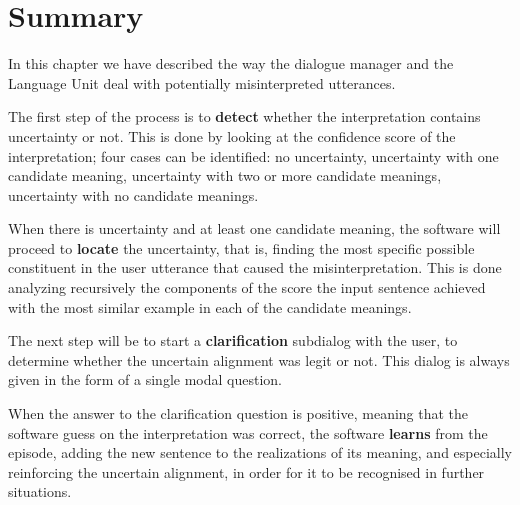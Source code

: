 \section{Summary}
In this chapter we have described the way the dialogue manager and the Language Unit deal with potentially misinterpreted utterances.

The first step of the process is to \textbf{detect} whether the interpretation contains uncertainty or not. This is done by looking at the confidence score of the interpretation; four cases can be identified: no uncertainty, uncertainty with one candidate meaning, uncertainty with two or more candidate meanings, uncertainty with no candidate meanings.

When there is uncertainty and at least one candidate meaning, the software will proceed to \textbf{locate} the uncertainty, that is, finding the most specific possible constituent in the user utterance that caused the misinterpretation. This is done analyzing recursively the components of the score the input sentence achieved with the most similar example in each of the candidate meanings.

The next step will be to start a \textbf{clarification} subdialog with the user, to determine whether the uncertain alignment was legit or not. This dialog is always given in the form of a single modal question.

When the answer to the clarification question is positive, meaning that the software guess on the interpretation was correct, the software \textbf{learns} from the episode, adding the new sentence to the realizations of its meaning, and especially reinforcing the uncertain alignment, in order for it to be recognised in further situations.